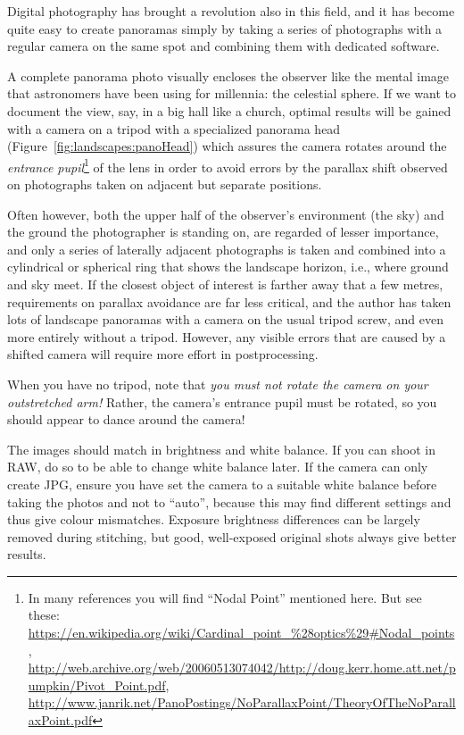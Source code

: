 Digital photography has brought a revolution also in this field, and it has
become quite easy to create panoramas simply by taking a series of
photographs with a regular camera on the same spot and combining them
with dedicated software.

A complete panorama photo visually encloses the observer like the
mental image that astronomers have been using for millennia: the
celestial sphere. If we want to document the view, say, in a big hall
like a church, optimal results will be gained with a camera on a
tripod with a specialized panorama head (Figure~\ref{fig:landscapes:panoHead}) which assures the camera
rotates around the \emph{entrance pupil}\footnote{In many references
  you will find ``Nodal Point'' mentioned here. But see these:
  \url{https://en.wikipedia.org/wiki/Cardinal_point_\%28optics\%29\#Nodal_points},
  \url{http://web.archive.org/web/20060513074042/http://doug.kerr.home.att.net/pumpkin/Pivot_Point.pdf},
  \url{http://www.janrik.net/PanoPostings/NoParallaxPoint/TheoryOfTheNoParallaxPoint.pdf}
} of the lens in order to avoid errors by the parallax shift observed
on photographs taken on adjacent but separate positions.


Often however, both the upper half of the observer's environment (the
sky) and the ground the photographer is standing on, are regarded of
lesser importance, and only a series of laterally adjacent photographs
is taken and combined into a cylindrical or spherical ring that shows
the landscape horizon, i.e.,  where ground and sky meet. If the
closest object of interest is farther away that a few metres,
requirements on parallax avoidance are far less critical, and the author
has taken lots of landscape panoramas with a camera on the usual
tripod screw, and even more entirely without a tripod. However, any visible errors
that are caused by a shifted camera will require more effort in
postprocessing.

When you have no tripod, note that \emph{you must not rotate the
  camera on your outstretched arm!} Rather, the camera's entrance
pupil must be rotated, so you should appear to dance around the
camera!

The images should match in brightness and white balance. If you can
shoot in RAW, do so to be able to change white balance later. If the
camera can only create JPG, ensure you have set the camera to a suitable white balance
before taking the photos and not to ``auto'', because this may find different settings and
thus give colour mismatches. Exposure brightness differences can be
largely removed during stitching, but good, well-exposed original
shots always give better results.

